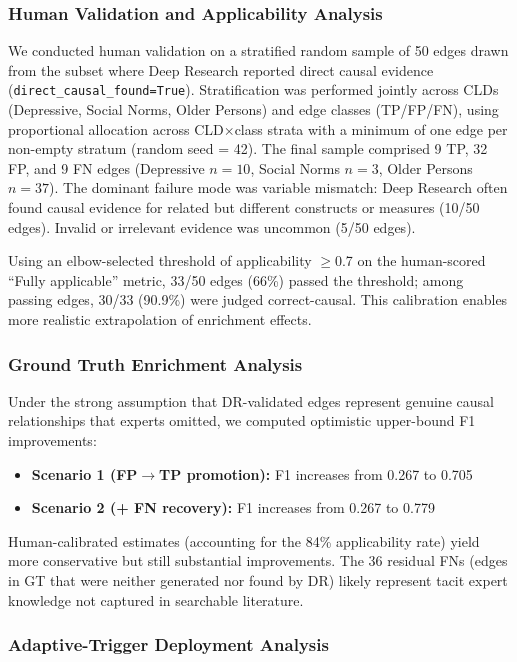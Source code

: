 \subsubsection{Human Validation and Applicability Analysis}

We conducted human validation on a stratified random sample of 50 edges drawn from the subset where Deep Research reported direct causal evidence (\texttt{direct\_causal\_found=True}). Stratification was performed jointly across CLDs (Depressive, Social Norms, Older Persons) and edge classes (TP/FP/FN), using proportional allocation across CLD$\times$class strata with a minimum of one edge per non-empty stratum (random seed = 42). The final sample comprised 9 TP, 32 FP, and 9 FN edges (Depressive $n=10$, Social Norms $n=3$, Older Persons $n=37$). The dominant failure mode was variable mismatch: Deep Research often found causal evidence for related but different constructs or measures (10/50 edges). Invalid or irrelevant evidence was uncommon (5/50 edges).

Using an elbow-selected threshold of applicability $\geq$0.7 on the human-scored ``Fully applicable'' metric, 33/50 edges (66\%) passed the threshold; among passing edges, 30/33 (90.9\%) were judged correct-causal. This calibration enables more realistic extrapolation of enrichment effects.

\subsubsection{Ground Truth Enrichment Analysis}

Under the strong assumption that DR-validated edges represent genuine causal relationships that experts omitted, we computed optimistic upper-bound F1 improvements:
\begin{itemize}[noitemsep]
    \item \textbf{Scenario 1 (FP$\rightarrow$TP promotion):} F1 increases from 0.267 to 0.705
    \item \textbf{Scenario 2 (+ FN recovery):} F1 increases from 0.267 to 0.779
\end{itemize}

Human-calibrated estimates (accounting for the 84\% applicability rate) yield more conservative but still substantial improvements. The 36 residual FNs (edges in GT that were neither generated nor found by DR) likely represent tacit expert knowledge not captured in searchable literature.

\subsubsection{Adaptive-Trigger Deployment Analysis}

